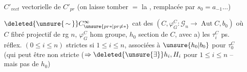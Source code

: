 $C'_{vect}$  vectorielle de $C'_{pr}$ (on laisse tomber  $=$ la , remplacée par $s_0=a_{-1}\ldots$)

$\deleted{\unsure{\,\sim\,}}C^{\infty}_{\unsure{pr*|pr\ne *}}$ cat des $(C,\varphi_G^C:\mathscr G_n\to\operatorname{Aut} C,b_0)$ où $C$ fibré projectif de rg $n$, $\varphi_G^C$ hom groupe, $h_0$ section de $C$, avec
a) les $\tau_i^C$ ps. réflex. $(0\leq i\leq n)$ strictes si $1\leq i\leq n$, associées à $\unsure{h_0|b_0}$ pour $\tau_0^C$ (qui peut être non stricte ($\Rightarrow \deleted{\unsure{\exists}}h_i,H_i$ pour $1\leq i\leq n$ -- mais pas de $h_0$)


